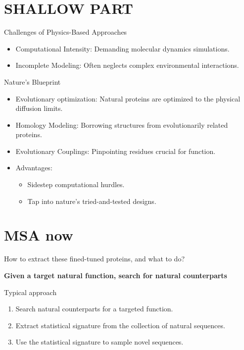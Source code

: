 \documentclass[presentation,smaller]{beamer}
\author{vopuu}
\date{\today}
\title{}
\begin{document}
\section*{SHALLOW PART}
\label{sec:org6e630e5}

\begin{frame}[label={sec:org720ff71}]{Challenges of Physics-Based Approaches}
\begin{itemize}
\item \alert{\alert{Computational Intensity}}: Demanding molecular dynamics simulations.
\item \alert{\alert{Incomplete Modeling}}: Often neglects complex environmental interactions.
\end{itemize}
\end{frame}

\begin{frame}[label={sec:orgcc15d1e}]{Nature's Blueprint}
\begin{itemize}
\item \alert{\alert{Evolutionary optimization}}: Natural proteins are optimized to the physical
diffusion limits.
\item \alert{\alert{Homology Modeling}}: Borrowing structures from evolutionarily related proteins.
\item \alert{\alert{Evolutionary Couplings}}: Pinpointing residues crucial for function.
\item \alert{\alert{Advantages}}:
\begin{itemize}
\item Sidestep computational hurdles.
\item Tap into nature's tried-and-tested designs.
\end{itemize}
\end{itemize}
\end{frame}

\section*{MSA now}
\label{sec:org68ae961}

\begin{frame}[label={sec:orga973ce2}]{How to extract these fined-tuned proteins, and what to do?}
\begin{center}
\Large \textbf{Given a target natural function, search for natural counterparts}
\end{center}
\end{frame}

\begin{frame}[label={sec:org42f1aae}]{Typical approach}
\begin{center}
\Large
\begin{enumerate}
\item Search natural counterparts for a targeted function.
\item Extract statistical signature from the collection of natural sequences.
\item Use the statistical signature to sample novel sequences.
\end{enumerate}
\end{center}
\end{frame}
\end{document}
